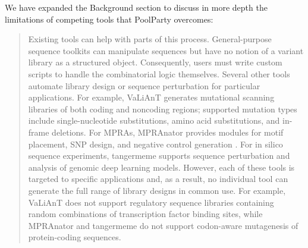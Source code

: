 \documentclass[11pt]{article}
\newenvironment{response}{\par\color{responseblue}}{\par}
\newenvironment{msquote}
  {\begin{quote}\color{quotedtext}\noindent\ignorespaces}
  {\end{quote}}
\begin{document}
\begin{response}

We have expanded the Background section to discuss in more depth the limitations of competing tools that PoolParty overcomes:
  \begin{msquote}
    Existing tools can help with parts of this process. General-purpose sequence toolkits \citep{Cock2009df, Pereira2015wj, Klie2023kg} can manipulate sequences but have no notion of a variant library as a structured object. Consequently, users must write custom scripts to handle the combinatorial logic themselves. Several other tools automate library design or sequence perturbation for particular applications. For example, VaLiAnT \citep{Barbon2022th} generates mutational scanning libraries of both coding and noncoding regions; supported mutation types include single-nucleotide substitutions, amino acid substitutions, and in-frame deletions. For MPRAs, MPRAnator \citep{GeorgakopoulosSoares2017gb} provides modules for motif placement, SNP design, and negative control generation \citep[see also][]{Ghazi2018aa}. For in silico sequence experiments, tangermeme \citep{Schreiber2025nd} supports sequence perturbation and analysis of genomic deep learning models. However, each of these tools is targeted to specific applications and, as a result, no individual tool can generate the full range of library designs in common use. For example, VaLiAnT does not support regulatory sequence libraries containing random combinations of transcription factor binding sites, while MPRAnator and tangermeme do not support codon-aware mutagenesis of protein-coding sequences.
  \end{msquote}


\end{response}
\end{document}
